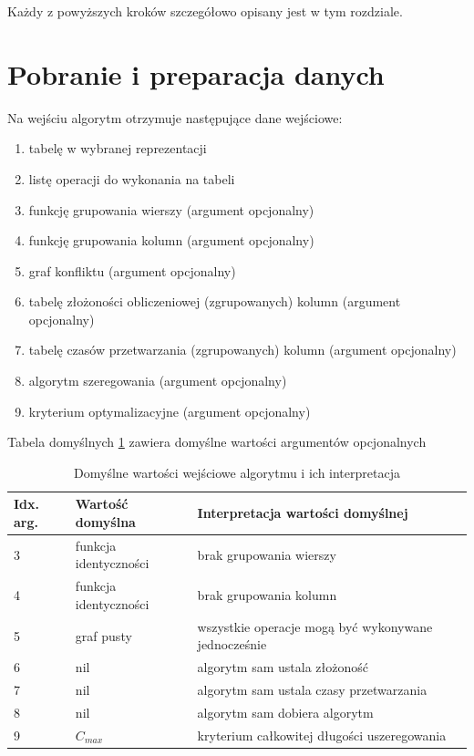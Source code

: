 \documentclass[brudnopis]{xmgr}
\begin{document}
Każdy z powyższych kroków szczegółowo opisany jest w tym rozdziale.

\newpage
\section{Pobranie i preparacja danych}

Na wejściu algorytm otrzymuje następujące dane wejściowe:

\begin{enumerate}
    \item tabelę w wybranej reprezentacji
    \item listę operacji do wykonania na tabeli
    \item funkcję grupowania wierszy (argument opcjonalny)
    \item funkcję grupowania kolumn (argument opcjonalny)
    \item graf konfliktu (argument opcjonalny)
    \item tabelę złożoności obliczeniowej (zgrupowanych) kolumn (argument opcjonalny)
    \item tabelę czasów przetwarzania (zgrupowanych) kolumn (argument opcjonalny)
    \item algorytm szeregowania (argument opcjonalny)
    \item kryterium optymalizacyjne (argument opcjonalny)
\end{enumerate}

Tabela domyślnych \ref{tab:args-default} zawiera domyślne wartości argumentów opcjonalnych 

\begin{table}[!tbh]
\begin{tabular}{|l|l|l|} \hline
Idx. arg. & Wartość domyślna & Interpretacja wartości domyślnej \\ \hline
3 & funkcja identyczności & brak grupowania wierszy \\ \hline
4 & funkcja identyczności & brak grupowania kolumn \\ \hline
5 & graf pusty & wszystkie operacje mogą być wykonywane jednocześnie \\ \hline
6 & nil & algorytm sam ustala złożoność \\ \hline
7 & nil & algorytm sam ustala czasy przetwarzania \\ \hline
8 & nil & algorytm sam dobiera algorytm \\ \hline
9 & $C_{max}$ & kryterium całkowitej długości uszeregowania \\ \hline
\end{tabular}
\caption{Domyślne wartości wejściowe algorytmu i ich interpretacja\label{tab:args-default}}
\end{table}
\end{document}
